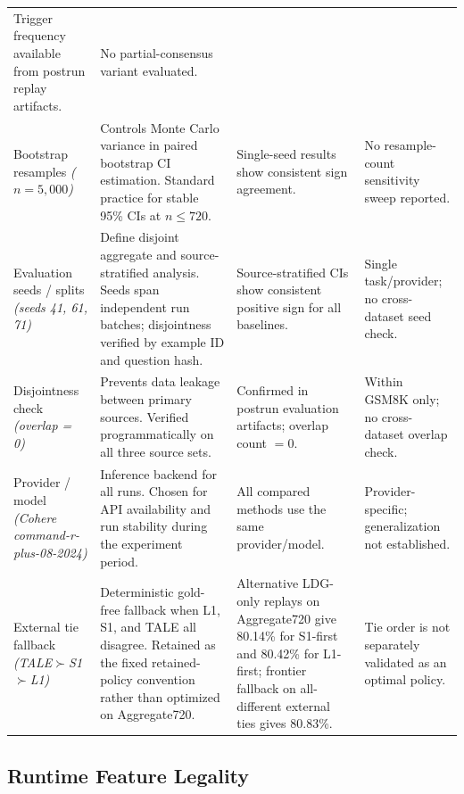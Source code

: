 \documentclass[smallcondensed]{svjour3}
\begin{document}
\begin{table}[H]
{\begin{tabular}{p{}p{}p{}p{}}
  Trigger frequency available from postrun replay artifacts. &
  No partial-consensus variant evaluated. \\
\addlinespace
Bootstrap resamples \newline \textit{($n = 5{,}000$)} &
  Controls Monte Carlo variance in paired bootstrap CI estimation.
  Standard practice for stable 95\% CIs at $n \leq 720$. &
  Single-seed results show consistent sign agreement. &
  No resample-count sensitivity sweep reported. \\
\addlinespace
Evaluation seeds / splits \newline \textit{(seeds 41, 61, 71)} &
  Define disjoint aggregate and source-stratified analysis.
  Seeds span independent run batches; disjointness verified by example ID and question hash. &
  Source-stratified CIs show consistent positive sign for all baselines. &
  Single task/provider; no cross-dataset seed check. \\
\addlinespace
Disjointness check \newline \textit{(overlap = 0)} &
  Prevents data leakage between primary sources.
  Verified programmatically on all three source sets. &
  Confirmed in postrun evaluation artifacts; overlap count $= 0$. &
  Within GSM8K only; no cross-dataset overlap check. \\
\addlinespace
Provider / model \newline \textit{(Cohere command-r-plus-08-2024)} &
  Inference backend for all runs.
  Chosen for API availability and run stability during the experiment period. &
  All compared methods use the same provider/model. &
  Provider-specific; generalization not established. \\
\addlinespace
External tie fallback \newline \textit{(TALE$\succ$S1$\succ$L1)} &
  Deterministic gold-free fallback when L1, S1, and TALE all disagree.
  Retained as the fixed retained-policy convention rather than optimized on Aggregate720. &
  Alternative LDG-only replays on Aggregate720 give 80.14\% for S1-first and 80.42\% for L1-first; frontier fallback on all-different external ties gives 80.83\%. &
  Tie order is not separately validated as an optimal policy. \\
\bottomrule
\end{tabular}}
\end{table}

\clearpage
\subsection*{Runtime Feature Legality}
\end{document}
